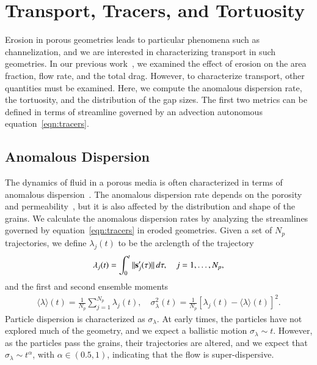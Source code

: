 \documentclass[preprint,10pt]{elsarticle}
\begin{document}
\section{Transport, Tracers, and Tortuosity}
\label{sec:transport}
Erosion in porous geometries leads to particular phenomena such as
channelization, and we are interested in characterizing transport in
such geometries.  In our previous work~\cite{qua-moo2018}, we examined
the effect of erosion on the area fraction, flow rate, and the total
drag.  However, to characterize transport, other quantities must be
examined.  Here, we compute the anomalous dispersion rate, the
tortuosity, and the distribution of the gap sizes.  The first two
metrics can be defined in terms of streamline governed by an advection
autonomous equation~\eqref{eqn:tracers}.

\subsection{Anomalous Dispersion}
\label{sec:dispersion}
The dynamics of fluid in a porous media is often characterized in terms
of anomalous dispersion~\cite{kla-rad-sok2008, den-cor-sch-ber2004}.
The anomalous dispersion rate depends on the porosity and
permeability~\cite{koc-bra1988}, but it is also affected by the
distribution and shape of the grains. We calculate the anomalous
dispersion rates by analyzing the streamlines governed by
equation~\eqref{eqn:tracers} in eroded geometries. Given a set of $N_p$
trajectories, we define $\lambda_j(t)$ to be the arclength of the
trajectory
\begin{align}
  \lambda_j(t) = \int_{0}^t \|\ss'_j(\tau)\|\, d\tau, 
    \quad j=1,\ldots,N_p,
\end{align}
and the first and second ensemble moments
\begin{align}
  \label{eqn:moments}
  \langle \lambda \rangle (t) = 
    \frac{1}{N_p} \sum_{j=1}^{N_p} \lambda_j(t), \quad 
    \sigma_\lambda^2(t) = \frac{1}{N_p} 
    \left[\lambda_j(t) - \langle \lambda \rangle(t) \right]^2.
\end{align}
Particle dispersion is characterized as $\sigma_\lambda$.  At early
times, the particles have not explored much of the geometry, and we
expect a ballistic motion $\sigma_\lambda \sim t$.  However, as the
particles pass the grains, their trajectories are altered, and we expect
that $\sigma_\lambda \sim t^\alpha$, with $\alpha \in (0.5,1)$,
indicating that the flow is super-dispersive.
\end{document}
